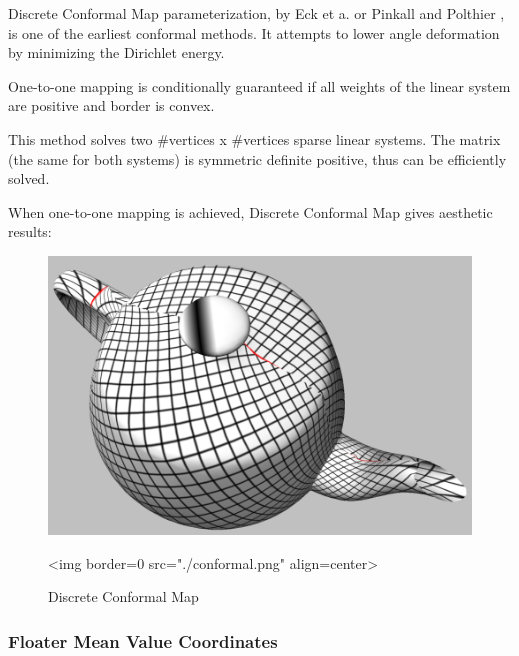 Discrete Conformal Map parameterization, by Eck et a. or Pinkall and Polthier
\cite{cgal:fh-survey-05}, is one of the earliest conformal methods. It attempts
to lower angle deformation by minimizing the Dirichlet energy.

One-to-one mapping is conditionally guaranteed if all weights
of the linear system are positive and border is convex.

This method solves two \#vertices x \#vertices sparse linear systems. The matrix
(the same for both systems) is symmetric definite positive, thus can be
efficiently solved.

When one-to-one mapping is achieved, Discrete Conformal Map gives aesthetic results:

\begin{figure}[bht]
    \begin{center}
        \begin{ccTexOnly}
            \includegraphics{Parameterization/conformal} %
        \end{ccTexOnly}
        \begin{ccHtmlOnly}
            <img border=0 src="./conformal.png" align=center>
        \end{ccHtmlOnly}
        \label{parameterization-fig-conformal}

        \caption{Discrete Conformal Map}
    \end{center}
\end{figure}


\subsubsection{Floater Mean Value Coordinates}

